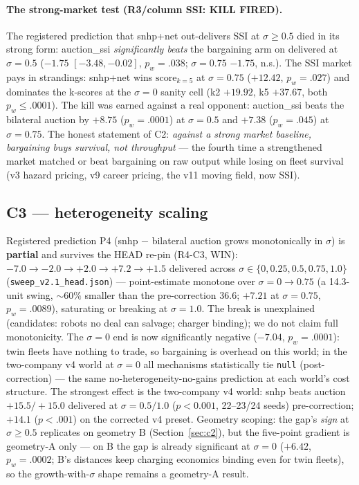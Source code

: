 \documentclass[sigconf,nonacm]{acmart}
\begin{document}
\paragraph{The strong-market test (R3/column SSI: KILL FIRED).} The
registered prediction that snhp+net out-delivers SSI at $\sigma{\geq}0.5$
died in its strong form: auction\_ssi \emph{significantly beats} the
bargaining arm on delivered at $\sigma{=}0.5$ ($-1.75$ $[-3.48, -0.02]$,
$p_w{=}.038$; $\sigma{=}0.75$ $-1.75$, n.s.). The SSI market pays in
strandings: snhp+net wins $\mathrm{score}_{k=5}$ at $\sigma{=}0.75$
($+12.42$, $p_w{=}.027$) and dominates the k-scores at the $\sigma{=}0$
sanity cell (k2 $+19.92$, k5 $+37.67$, both $p_w{\leq}.0001$). The kill was
earned against a real opponent: auction\_ssi beats the bilateral auction by
$+8.75$ ($p_w{=}.0001$) at $\sigma{=}0.5$ and $+7.38$ ($p_w{=}.045$) at
$\sigma{=}0.75$. The honest statement of C2: \emph{against a strong market
baseline, bargaining buys survival, not throughput} --- the fourth time a
strengthened market matched or beat bargaining on raw output while losing
on fleet survival (v3 hazard pricing, v9 career pricing, the v11 moving
field, now SSI).

\subsection{C3 --- heterogeneity scaling}\label{sec:c3}

Registered prediction P4 (snhp $-$ bilateral auction grows monotonically in
$\sigma$) is \textbf{partial} and survives the HEAD re-pin (R4-C3, WIN):
$-7.0 \to -2.0 \to +2.0 \to +7.2 \to +1.5$ delivered across $\sigma \in
\{0, 0.25, 0.5, 0.75, 1.0\}$ (\texttt{sweep\_v2.1\_head.json}) ---
point-estimate monotone over $\sigma{=}0{\to}0.75$ (a 14.3-unit swing,
${\sim}60\%$ smaller than the pre-correction 36.6; $+7.21$ at
$\sigma{=}0.75$, $p_w{=}.0089$), saturating or breaking at $\sigma{=}1.0$.
The break is unexplained (candidates: robots no deal can salvage; charger
binding); we do not claim full monotonicity. The $\sigma{=}0$ end is now
significantly negative ($-7.04$, $p_w{=}.0001$): twin fleets have nothing
to trade, so bargaining is overhead on this world; in the two-company v4
world at $\sigma{=}0$ all mechanisms statistically tie \texttt{null}
(post-correction) --- the same no-heterogeneity-no-gains prediction at each
world's cost structure. The strongest effect is the two-company v4 world:
snhp beats auction $+15.5/+15.0$ delivered at $\sigma{=}0.5/1.0$
($p{<}0.001$, 22--23/24 seeds) pre-correction; $+14.1$ ($p{<}.001$) on the
corrected v4 preset. Geometry scoping: the gap's \emph{sign} at
$\sigma{\geq}0.5$ replicates on geometry B (Section~\ref{sec:c2}), but the
five-point gradient is geometry-A only --- on B the gap is already
significant at $\sigma{=}0$ ($+6.42$, $p_w{=}.0002$; B's distances keep
charging economics binding even for twin fleets), so the
growth-with-$\sigma$ shape remains a geometry-A result.
\end{document}

